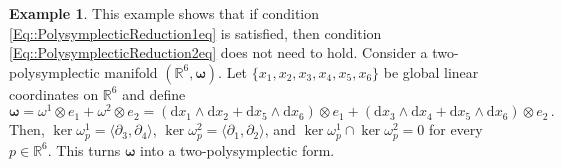 \documentclass[11pt]{article}
\theoremstyle{plain}
\theoremstyle{definition}
\newtheorem{example}[theorem]{Example}
\renewcommand{\d}{\mathrm{d}}
\def\d{\mathrm{d}}
\numberwithin{equation}{section}
\begin{document}
\begin{example} This example shows that if condition \eqref{Eq::PolysymplecticReduction1eq} is satisfied, then condition \eqref{Eq::PolysymplecticReduction2eq} does not need to hold.  
Consider a two-polysymplectic manifold $(\mathbb{R}^6,\boldsymbol{\omega})$. Let  $\{x_1,x_2,x_3,x_4,x_5,x_6\}$ be global linear coordinates on  $\mathbb{R}^6$ and define$$
    \boldsymbol{\omega} = \omega^1\otimes e_1+\omega^2\otimes e_2 = (\d x_1\wedge \d x_2 + \d x_5\wedge \d x_6)\otimes e_1 + (\d x_3\wedge \d x_4 + \d x_5\wedge \d x_6)\otimes e_2\,.
$$
Then, $\ker\omega^1_p=\langle \partial_{3},\partial_4\rangle$, $\ker\omega^2_p=\langle \partial_1,\partial_2\rangle$, and $\ker\omega^1_p\cap\ker\omega^2_p=0$ for every $p\in\mathbb{R}^6$. This turns $\boldsymbol{ \omega}$ into a two-polysymplectic form. 


\end{example}
\end{document}
